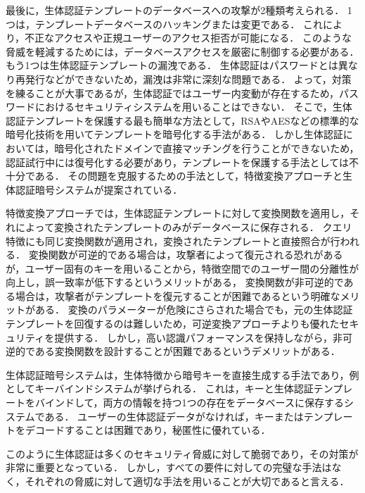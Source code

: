 最後に，生体認証テンプレートのデータベースへの攻撃が2種類考えられる．
1つは，テンプレートデータベースのハッキングまたは変更である．
これにより，不正なアクセスや正規ユーザーのアクセス拒否が可能になる．
このような脅威を軽減するためには，データベースアクセスを厳密に制御する必要がある．
もう1つは生体認証テンプレートの漏洩である．
生体認証はパスワードとは異なり再発行などができないため，漏洩は非常に深刻な問題である．
よって，対策を練ることが大事であるが，生体認証ではユーザー内変動が存在するため，パスワードにおけるセキュリティシステムを用いることはできない．
そこで，生体認証テンプレートを保護する最も簡単な方法として，RSAやAESなどの標準的な暗号化技術を用いてテンプレートを暗号化する手法がある．
しかし生体認証においては，暗号化されたドメインで直接マッチングを行うことができないため，認証試行中には復号化する必要があり，テンプレートを保護する手法としては不十分である．
その問題を克服するための手法として，特徴変換アプローチと生体認証暗号システムが提案されている．

特徴変換アプローチでは，生体認証テンプレートに対して変換関数を適用し，それによって変換されたテンプレートのみがデータベースに保存される．
クエリ特徴にも同じ変換関数が適用され，変換されたテンプレートと直接照合が行われる．
変換関数が可逆的である場合は，攻撃者によって復元される恐れがあるが，ユーザー固有のキーを用いることから，特徴空間でのユーザー間の分離性が向上し，誤一致率が低下するというメリットがある，
変換関数が非可逆的である場合は，攻撃者がテンプレートを復元することが困難であるという明確なメリットがある．
変換のパラメーターが危険にさらされた場合でも，元の生体認証テンプレートを回復するのは難しいため，可逆変換アプローチよりも優れたセキュリティを提供する．
しかし，高い認識パフォーマンスを保持しながら，非可逆的である変換関数を設計することが困難であるというデメリットがある．

生体認証暗号システムは，生体特徴から暗号キーを直接生成する手法であり，例としてキーバインドシステムが挙げられる．
これは，キーと生体認証テンプレートをバインドして，両方の情報を持つ1つの存在をデータベースに保存するシステムである．
ユーザーの生体認証データがなければ，キーまたはテンプレートをデコードすることは困難であり，秘匿性に優れている．

このように生体認証は多くのセキュリティ脅威に対して脆弱であり，その対策が非常に重要となっている．
しかし，すべての要件に対しての完璧な手法はなく，それぞれの脅威に対して適切な手法を用いることが大切であると言える．